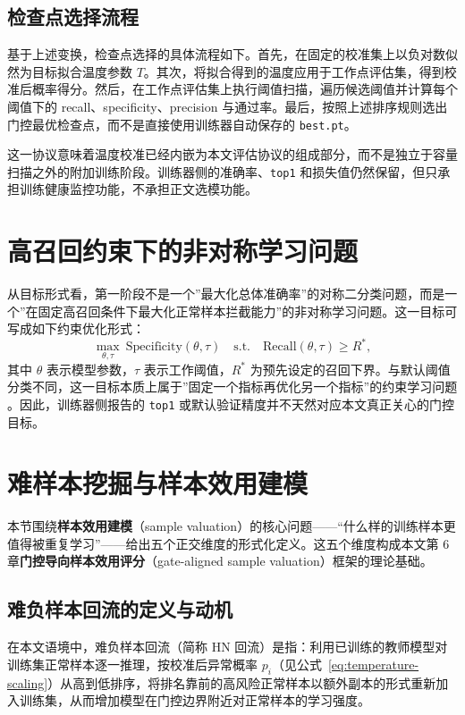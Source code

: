 \documentclass[UTF8,openany,12pt]{ctexbook}
\newcommand{\formalmetric}[1]{\texttt{#1}}
\begin{document}
\subsection{检查点选择流程}
基于上述变换，检查点选择的具体流程如下。首先，在固定的校准集上以负对数似然为目标拟合温度参数 $T$。其次，将拟合得到的温度应用于工作点评估集，得到校准后概率得分。然后，在工作点评估集上执行阈值扫描，遍历候选阈值并计算每个阈值下的 recall、specificity、precision 与通过率。最后，按照上述排序规则选出门控最优检查点，而不是直接使用训练器自动保存的 \texttt{best.pt}。

这一协议意味着温度校准已经内嵌为本文评估协议的组成部分，而不是独立于容量扫描之外的附加训练阶段。训练器侧的准确率、\formalmetric{top1} 和损失值仍然保留，但只承担训练健康监控功能，不承担正文选模功能。

\section{高召回约束下的非对称学习问题}
从目标形式看，第一阶段不是一个”最大化总体准确率”的对称二分类问题，而是一个”在固定高召回条件下最大化正常样本拦截能力”的非对称学习问题。这一目标可写成如下约束优化形式：
\begin{equation}
\max_{\theta,\tau}\ \mathrm{Specificity}(\theta,\tau)
\quad
\text{s.t.}\quad
\mathrm{Recall}(\theta,\tau)\ge R^\ast,
\end{equation}
其中 $\theta$ 表示模型参数，$\tau$ 表示工作阈值，$R^\ast$ 为预先设定的召回下界。与默认阈值分类不同，这一目标本质上属于”固定一个指标再优化另一个指标”的约束学习问题 \cite{kumar2021constrained}。因此，训练器侧报告的 \formalmetric{top1} 或默认验证精度并不天然对应本文真正关心的门控目标。

\section{难样本挖掘与样本效用建模}
本节围绕\textbf{样本效用建模}（sample valuation）的核心问题——“什么样的训练样本更值得被重复学习”——给出五个正交维度的形式化定义。这五个维度构成本文第 6 章\textbf{门控导向样本效用评分}（gate-aligned sample valuation）框架的理论基础。

\subsection{难负样本回流的定义与动机}
在本文语境中，难负样本回流（简称 HN 回流）是指：利用已训练的教师模型对训练集正常样本逐一推理，按校准后异常概率 $p_i$（见公式~\ref{eq:temperature-scaling}）从高到低排序，将排名靠前的高风险正常样本以额外副本的形式重新加入训练集，从而增加模型在门控边界附近对正常样本的学习强度。
\end{document}
